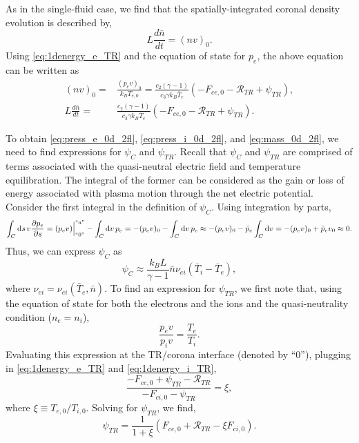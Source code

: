 As in the single-fluid case, we find that the spatially-integrated coronal density evolution is described by,
\begin{equation}
    L\frac{d\bar{n}}{dt} = (nv)_0.
\end{equation}
Using \autoref{eq:1denergy_e_TR} and the equation of state for $p_e$, the above equation can be written as
\begin{align}
    (nv)_0 =& \frac{(p_ev)_0}{k_BT_{e,0}} = \frac{c_2(\gamma - 1)}{c_3\gamma k_B\bar{T}_e}(-F_{ce,0} - \mathcal{R}_{TR} + \psi_{TR}),\\
    L\frac{d\bar{n}}{dt} =& \frac{c_2(\gamma - 1)}{c_3\gamma k_B\bar{T}_e}(-F_{ce,0} - \mathcal{R}_{TR} + \psi_{TR}).\label{eq:0d_mass_sub}
\end{align}

To obtain \autoref{eq:press_e_0d_2fl}, \autoref{eq:press_i_0d_2fl}, and \autoref{eq:mass_0d_2fl}, we need to find expressions for $\psi_C$ and $\psi_{TR}$. Recall that $\psi_C$ and $\psi_{TR}$ are comprised of terms associated with the quasi-neutral electric field and temperature equilibration. The integral of the former can be considered as the gain or loss of energy associated with plasma motion through the net electric potential. Consider the first integral in the definition of $\psi_C$. Using integration by parts,
\begin{equation}
    \int_C\mathrm{d}s\,v\frac{\partial p_e}{\partial s} = (p_ev)\Big|^{``a"}_{``0"} - \int_C\mathrm{d}v\,p_e = -(p_ev)_0 - \int_C\mathrm{d}v\,p_e\approx -(p_ev)_0 -\bar{p}_e\int_C\mathrm{d}v = -(p_ev)_0 + \bar{p}_ev_0 \approx 0.
\end{equation}
Thus, we can express $\psi_C$ as
\begin{equation}
    \psi_C\approx\frac{k_BL}{\gamma -1}\bar{n}\nu_{ei}(\bar{T}_i - \bar{T}_e),
    \label{eq:psi_C}
\end{equation}
where $\nu_{ei}=\nu_{ei}(\bar{T}_e,\bar{n})$. To find an expression for $\psi_{TR}$, we first note that, using the equation of state for both the electrons and the ions and the quasi-neutrality condition ($n_e=n_i$),
\begin{equation}
    \frac{p_ev}{p_iv} = \frac{T_e}{T_i}.
\end{equation}
Evaluating this expression at the TR/corona interface (denoted by ``0''), plugging in \autoref{eq:1denergy_e_TR} and \autoref{eq:1denergy_i_TR},
\begin{equation}
    \frac{- F_{ce,0} + \psi_{TR} - \mathcal{R}_{TR}}{- F_{ci,0} - \psi_{TR}} = \xi,
\end{equation}
where $\xi\equiv T_{e,0}/T_{i,0}$. Solving for $\psi_{TR}$, we find,
\begin{equation}
    \psi_{TR} = \frac{1}{1+\xi}(F_{ce,0} + \mathcal{R}_{TR} - \xi F_{ci,0}).
    \label{eq:psi_TR}
\end{equation}

